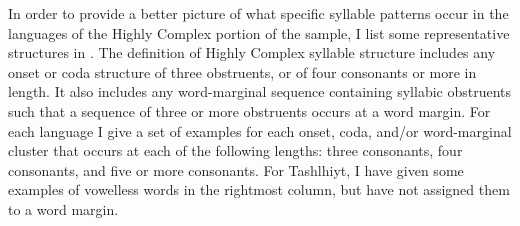   In order to provide a better picture of what specific syllable patterns occur in the languages of the Highly Complex portion of the sample, I list some representative structures in . The definition of Highly Complex syllable structure includes any onset or coda structure of three obstruents, or of four consonants or more in length. It also includes any word-marginal sequence containing syllabic obstruents such that a sequence of three or more obstruents occurs at a word margin. For each language I give a set of examples for each onset, coda, and/or word-marginal cluster that occurs at each of the following lengths: three consonants, four consonants, and five or more consonants. For Tashlhiyt, I have given some examples of vowelless words in the rightmost column, but have not assigned them to a word margin.

